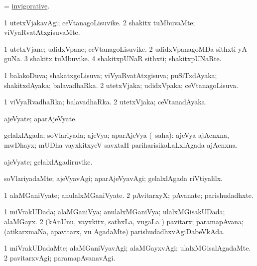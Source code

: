 \bentry
{}
\gl{\gu}
\bmng
= \hyperlink{invigorative}{invigorative}. 
\emng
\eentry

\bentry
{}
\gl{\kirxvi}
\bmng
\bnum
\num{1} utetxVjakavAgi; ceVtanagoLisuvike. 
\num{2} shakitx tuMbuvaMte; viVyaRvatAtxgisuvaMte. 
\enum
\emng
\eentry

\bentry
{}
\gl{\nA}
\bmng
\bnum
\num{1} utetxVjane; udidxVpane; ceVtanagoLisuvike. 
\num{2} udidxVpanagoMDa sithxti yA guNa. 
\num{3} shakitx tuMbuvike. 
\num{4} shakitxpUNaR sithxti; shakitxpUNaRte. 
\enum
\emng
\eentry

\bentry
{}
\gl{\gu}
\bmng
\bnum
\num{1} balakoDuva; shakatxgoLisuva; viVyaRvatAtxgisuva; puSiTxdAyaka; shakitxdAyaka; balavadhaRka. 
\num{2} utetxVjaka; udidxVpaka; ceVtanagoLisuva. 
\enum
\emng
\eentry

\bentry
{}
\gl{\nA}
\bmng
\bnum
\num{1} viVyaRvadhaRka; balavadhaRka. 
\num{2} utetxVjaka; ceVtanadAyaka. 
\enum
\emng
\eentry

\bentry
{}
\gl{\nA}
\bmng
ajeVyate; aparAjeVyate. 
\emng
\eentry

\bentry
{}
\gl{\gu}
\bmng
gelalxlAgada; soVlariyada; ajeVya; aparAjeVya (\rUpa\ saha):  ajeVya ajAcnxna, mwDhayx; mUDha vayxkitxyeV savxtaH pariharisikoLaLxlAgada ajAcnxna. 
\emng
\eentry

\bentry
{}
\gl{\nA}
\bmng
ajeVyate; gelalxlAgadiruvike. 
\emng
\eentry

\bentry
{}
\gl{\kirxvi}
\bmng
soVlariyadaMte; ajeVyavAgi; aparAjeVyavAgi; gelalxlAgada riVtiyalilx. 
\emng
\eentry

\bentry
{}
\gl{\nA}
\bmng
\bnum
\num{1} alaMGaniVyate; anulalxMGaniVyate. 
\num{2} pAvitarxyX; pAvanate; parishudadhxte. 
\enum
\emng
\eentry

\bentry
{}
\gl{\gu}
\bmng
\bnum
\num{1} miVrakUDada; alaMGaniVya; anulalxMGaniVya; ulalxMGisakUDada; alaMGayx. 
\num{2} (kAnUnu, vayxkitx, sathxLa, \mo vugaLa \vi) pavitarx; paramapAvana; (atikarxmaNa, apavitarx, \mo vu AgadaMte) parishudadhxvAgiDabeVkAda. 
\enum
\emng
\eentry

\bentry
{}
\gl{\kirxvi}
\bmng
\bnum
\num{1} miVrakUDadaMte; alaMGaniVyavAgi; alaMGayxvAgi; ulalxMGisalAgadaMte. 
\num{2} pavitarxvAgi; paramapAvanavAgi. 
\enum
\emng
\eentry

